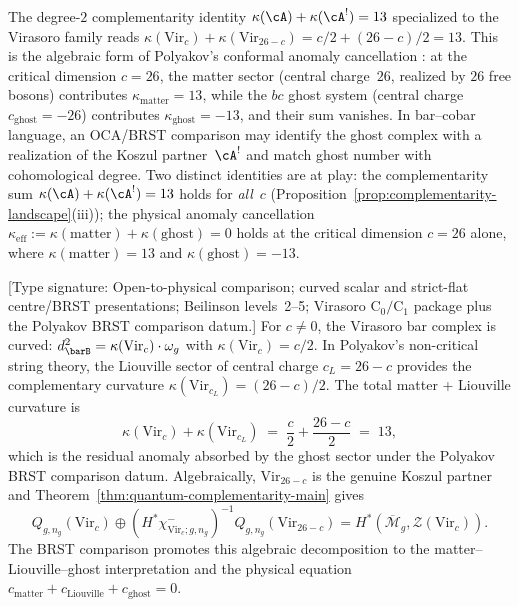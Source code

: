 \begin{remark}
\label{rem:complementarity-polyakov-cancellation}
The degree-$2$ complementarity identity
$\kappa(\cA) + \kappa(\cA^!) = 13$ specialized to the Virasoro
family reads $\kappa(\mathrm{Vir}_c) + \kappa(\mathrm{Vir}_{26-c})
= c/2 + (26{-}c)/2 = 13$. This is the algebraic form of Polyakov's
conformal anomaly cancellation \cite{Polyakov1981}: at the critical
dimension $c = 26$, the matter sector (central charge~$26$,
realized by $26$ free bosons) contributes
$\kappa_{\mathrm{matter}} = 13$, while the $bc$ ghost system
(central charge $c_{\mathrm{ghost}} = -26$) contributes
$\kappa_{\mathrm{ghost}} = -13$, and their sum vanishes. In
bar--cobar language, an OCA/BRST comparison may identify the ghost
complex with a realization of the Koszul partner~$\cA^!$ and match
ghost number with cohomological degree. Two distinct identities are at
play:
the complementarity sum
$\kappa(\cA) + \kappa(\cA^!) = 13$ holds for \emph{all}~$c$
(Proposition~\ref{prop:complementarity-landscape}(iii));
the physical anomaly cancellation
$\kappa_{\mathrm{eff}} := \kappa(\mathrm{matter}) +
\kappa(\mathrm{ghost}) = 0$ holds at the critical dimension $c = 26$
alone, where $\kappa(\mathrm{matter}) = 13$ and
$\kappa(\mathrm{ghost}) = -13$.
\end{remark}

\begin{proposition}
\label{prop:non-critical-liouville}
\textup{[Type signature: Open-to-physical comparison; curved scalar
and strict-flat centre/BRST presentations; Beilinson levels~2--5;
Virasoro \(\mathrm C_0/\mathrm C_1\) package plus the Polyakov
BRST comparison datum.]}
For $c \neq 0$, the Virasoro bar complex is curved:
$d_{\barB}^2 = \kappa(\mathrm{Vir}_c) \cdot \omega_g$ with
$\kappa(\mathrm{Vir}_c) = c/2$. In Polyakov's non-critical
string theory, the Liouville sector of central charge
$c_L = 26 - c$ provides the complementary curvature
$\kappa(\mathrm{Vir}_{c_L}) = (26{-}c)/2$. The total matter +
Liouville curvature is
\[
\kappa(\mathrm{Vir}_c) + \kappa(\mathrm{Vir}_{c_L})
\;=\; \frac{c}{2} + \frac{26 - c}{2}
\;=\; 13,
\]
which is the residual anomaly absorbed by the ghost sector
under the Polyakov BRST comparison datum.  Algebraically,
$\mathrm{Vir}_{26-c}$ is the genuine Koszul partner and
Theorem~\textup{\ref{thm:quantum-complementarity-main}} gives
\[
Q_{g,n_g}(\mathrm{Vir}_c)\oplus
(H^*\chi^-_{\mathrm{Vir}_c;g,n_g})^{-1}
Q_{g,n_g}(\mathrm{Vir}_{26-c})
=H^*(\overline{\mathcal M}_g,\mathcal Z(\mathrm{Vir}_c)).
\]
The BRST comparison promotes this algebraic decomposition to the
matter--Liouville--ghost interpretation and the physical equation
$c_{\mathrm{matter}}+c_{\mathrm{Liouville}}+c_{\mathrm{ghost}}=0$.
\end{proposition}

